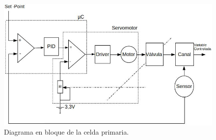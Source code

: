 \begin{figure}[htpb]
\centering
\includegraphics[scale=.65]{./Figures/Diagrama-en-bloque-general-con-servomotor-V2.jpg}
\caption{Diagrama en bloque de la celda primaria.}
\label{fig:Diagrama en bloque de la celda primaria}
\end{figure}


